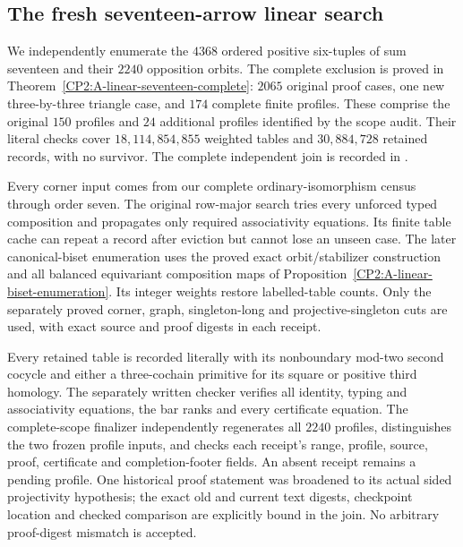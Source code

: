 \documentclass[11pt]{article}
\begin{document}






\subsection{The fresh seventeen-arrow linear search}
We independently enumerate the $4368$ ordered positive six-tuples of sum
seventeen and their $2240$ opposition orbits. The complete exclusion is
proved in Theorem~\ref{CP2:A-linear-seventeen-complete}: $2065$ original
proof cases, one new three-by-three triangle case, and $174$ complete
finite profiles. These comprise the original $150$ profiles and $24$
additional profiles identified by the scope audit. Their literal checks
cover $18{,}114{,}854{,}855$ weighted tables and $30{,}884{,}728$ retained
records, with no survivor. The complete independent join is recorded in
.

Every corner input comes from our complete ordinary-isomorphism census
through order seven. The original row-major search tries every unforced
typed composition and propagates only required associativity equations.
Its finite table cache can repeat a record after eviction but cannot
lose an unseen case. The later canonical-biset enumeration uses the
proved exact orbit/stabilizer construction and all balanced equivariant
composition maps of Proposition~\ref{CP2:A-linear-biset-enumeration}.
Its integer weights restore labelled-table counts. Only the separately
proved corner, graph, singleton-long and projective-singleton cuts are
used, with exact source and proof digests in each receipt.

Every retained table is recorded literally with its nonboundary mod-two
second cocycle and either a three-cochain primitive for its square or
positive third homology. The separately written checker verifies all
identity, typing and associativity equations, the bar ranks and every
certificate equation. The complete-scope finalizer independently
regenerates all $2240$ profiles, distinguishes the two frozen profile
inputs, and checks each receipt's range, profile, source, proof,
certificate and completion-footer fields. An absent receipt remains a
pending profile. One historical proof statement was broadened to its
actual sided projectivity hypothesis; the exact old and current text
digests, checkpoint location and checked comparison are explicitly bound
in the join. No arbitrary proof-digest mismatch is accepted.
\end{document}
